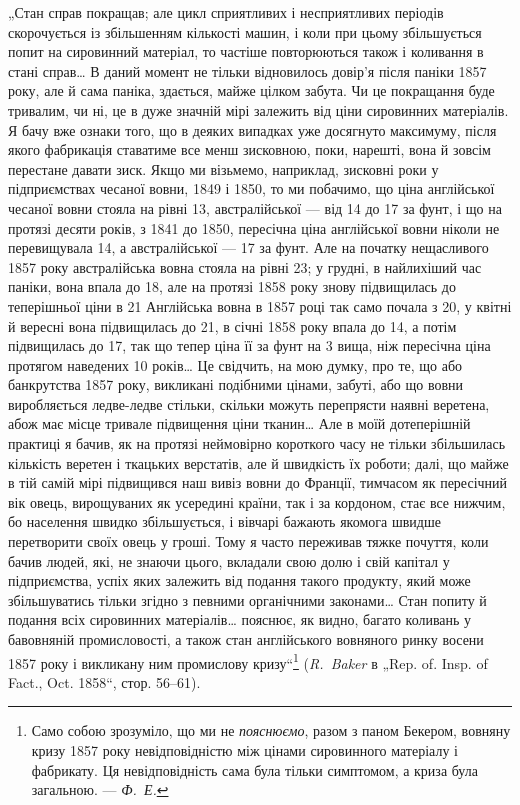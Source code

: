 
„Стан справ покращав; але цикл сприятливих і несприятливих
періодів скорочується із збільшенням кількості машин, і
коли при цьому збільшується попит на сировинний матеріал,
то частіше повторюються також і коливання в стані справ\dots{}
В даний момент не тільки відновилось довір’я після паніки
1857 року, але й сама паніка, здається, майже цілком забута.
Чи це покращання буде тривалим, чи ні, це в дуже значній
мірі залежить від ціни сировинних матеріалів. Я бачу вже ознаки
того, що в деяких випадках уже досягнуто максимуму, після
якого фабрикація ставатиме все менш зисковною, поки, нарешті,
вона й зовсім перестане давати зиск. Якщо ми візьмемо, наприклад,
зисковні роки у підприємствах чесаної вовни, 1849 і 1850,
то ми побачимо, що ціна англійської чесаної вовни стояла на
рівні 13, австралійської — від 14 до 17 за фунт,
і що на протязі десяти років, з 1841 до 1850, пересічна ціна
англійської вовни ніколи не перевищувала 14, а австралійської
— 17 за фунт. Але на початку нещасливого
1857 року австралійська вовна стояла на рівні 23; у грудні,
в найлихіший час паніки, вона впала до 18, але на протязі
1858 року знову підвищилась до теперішньої ціни в 21
Англійська вовна в 1857 році так само почала з 20, у квітні
й вересні вона підвищилась до 21, в січні 1858 року впала
до 14, а потім підвищилась до 17, так що тепер
ціна її за фунт на 3 вища, ніж пересічна ціна протягом
наведених 10 років\dots{} Це свідчить, на мою думку, про те, що або
банкрутства 1857 року, викликані подібними цінами, забуті, або
що вовни виробляється ледве-ледве стільки, скільки можуть
перепрясти наявні веретена, абож має місце тривале підвищення
ціни тканин\dots{} Але в моїй дотеперішній практиці я бачив,
як на протязі неймовірно короткого часу не тільки збільшилась
кількість веретен і ткацьких верстатів, але й швидкість
їх роботи; далі, що майже в тій самій мірі підвищився наш вивіз
вовни до Франції, тимчасом як пересічний вік овець, вирощуваних
як усередині країни, так і за кордоном, стає все нижчим,
бо населення швидко збільшується, і вівчарі бажають якомога
швидше перетворити своїх овець у гроші. Тому я часто переживав
тяжке почуття, коли бачив людей, які, не знаючи цього, вкладали
свою долю і свій капітал у підприємства, успіх яких залежить від
подання такого продукту, який може збільшуватись тільки
згідно з певними органічними законами\dots{} Стан попиту й подання
всіх сировинних матеріалів\dots{} пояснює, як видно, багато коливань
у бавовняній промисловості, а також стан англійського вовняного
ринку восени 1857 року і викликану ним промислову кризу“\footnote{Само собою зрозуміло, що ми не \emph{пояснюємо}, разом з паном Бекером,
вовняну кризу 1857 року невідповідністю між цінами сировинного матеріалу
і фабрикату. Ця невідповідність сама була тільки симптомом, а криза була
загальною. — \emph{Ф.~Е.}}
(\emph{R.~Baker} в „Rep. of. Insp. of Fact., Oct. 1858“, стор. 56--61).
